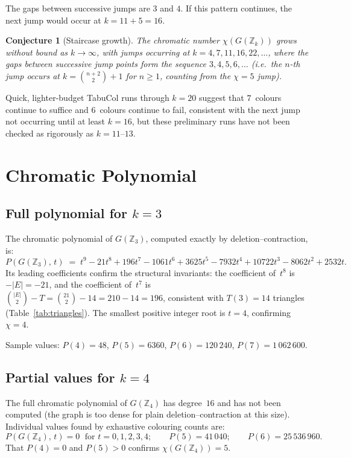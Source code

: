\documentclass[12pt]{article}
\newtheorem{conjecture}[theorem]{Conjecture}
\theoremstyle{definition}
\theoremstyle{remark}
\newcommand{\Z}{\mathbb{Z}}
\newcommand{\GZk}{G(\Z_k)}
\begin{document}
The gaps between successive jumps are $3$ and $4$.  If this pattern
continues, the next jump would occur at $k = 11 + 5 = 16$.

\begin{conjecture}[Staircase growth]
\label{conj:staircase}
The chromatic number $\chi(\GZk)$ grows without bound as $k \to \infty$,
with jumps occurring at $k = 4, 7, 11, 16, 22, \ldots$, where the gaps
between successive jump points form the sequence $3, 4, 5, 6, \ldots$
(i.e.\ the $n$-th jump occurs at $k = \binom{n+2}{2} + 1$ for $n \ge 1$,
counting from the $\chi = 5$ jump).
\end{conjecture}

Quick, lighter-budget TabuCol runs through $k = 20$ suggest that $7$~colours
continue to suffice and $6$~colours continue to fail, consistent with the
next jump not occurring until at least $k = 16$, but these preliminary runs
have not been checked as rigorously as $k = 11$--$13$.


\section{Chromatic Polynomial}
\label{sec:chrompoly}

\subsection{Full polynomial for $k = 3$}

The chromatic polynomial of $G(\Z_3)$, computed exactly by
deletion--contraction, is:
\[
  P(G(\Z_3),\, t) \;=\; t^9 - 21t^8 + 196t^7 - 1061t^6 + 3625t^5
    - 7932t^4 + 10722t^3 - 8062t^2 + 2532t.
\]
Its leading coefficients confirm the structural invariants: the coefficient
of~$t^8$ is $-|E| = -21$, and the coefficient of~$t^7$ is
$\binom{|E|}{2} - T = \binom{21}{2} - 14 = 210 - 14 = 196$, consistent
with $T(3) = 14$ triangles (Table~\ref{tab:triangles}).  The smallest
positive integer root is $t = 4$, confirming $\chi = 4$.

Sample values: $P(4) = 48$, $P(5) = 6360$, $P(6) = 120\,240$,
$P(7) = 1\,062\,600$.


\subsection{Partial values for $k = 4$}

The full chromatic polynomial of $G(\Z_4)$ has degree~$16$ and has not been
computed (the graph is too dense for plain deletion--contraction at this
size).  Individual values found by exhaustive colouring counts are:
\[
  P(G(\Z_4),\, t) = 0 \;\text{ for } t = 0, 1, 2, 3, 4;
  \qquad P(5) = 41\,040;\qquad P(6) = 25\,536\,960.
\]
That $P(4) = 0$ and $P(5) > 0$ confirms $\chi(G(\Z_4)) = 5$.
\end{document}
